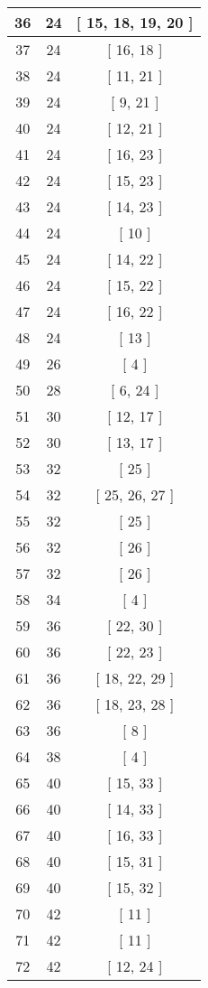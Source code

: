 \begin{center}
\begin{longtable}[H]{|| c c c ||}
\hline
36 & 24 & [ 15, 18, 19, 20 ] \\ 
\hline
37 & 24 & [ 16, 18 ] \\ 
\hline
38 & 24 & [ 11, 21 ] \\ 
\hline
39 & 24 & [ 9, 21 ] \\ 
\hline
40 & 24 & [ 12, 21 ] \\ 
\hline
41 & 24 & [ 16, 23 ] \\ 
\hline
42 & 24 & [ 15, 23 ] \\ 
\hline
43 & 24 & [ 14, 23 ] \\ 
\hline
44 & 24 & [ 10 ] \\ 
\hline
45 & 24 & [ 14, 22 ] \\ 
\hline
46 & 24 & [ 15, 22 ] \\ 
\hline
47 & 24 & [ 16, 22 ] \\ 
\hline
48 & 24 & [ 13 ] \\ 
\hline
49 & 26 & [ 4 ] \\ 
\hline
50 & 28 & [ 6, 24 ] \\ 
\hline
51 & 30 & [ 12, 17 ] \\ 
\hline
52 & 30 & [ 13, 17 ] \\ 
\hline
53 & 32 & [ 25 ] \\ 
\hline
54 & 32 & [ 25, 26, 27 ] \\ 
\hline
55 & 32 & [ 25 ] \\ 
\hline
56 & 32 & [ 26 ] \\ 
\hline
57 & 32 & [ 26 ] \\ 
\hline
58 & 34 & [ 4 ] \\ 
\hline
59 & 36 & [ 22, 30 ] \\ 
\hline
60 & 36 & [ 22, 23 ] \\ 
\hline
61 & 36 & [ 18, 22, 29 ] \\ 
\hline
62 & 36 & [ 18, 23, 28 ] \\ 
\hline
63 & 36 & [ 8 ] \\ 
\hline
64 & 38 & [ 4 ] \\ 
\hline
65 & 40 & [ 15, 33 ] \\ 
\hline
66 & 40 & [ 14, 33 ] \\ 
\hline
67 & 40 & [ 16, 33 ] \\ 
\hline
68 & 40 & [ 15, 31 ] \\ 
\hline
69 & 40 & [ 15, 32 ] \\ 
\hline
70 & 42 & [ 11 ] \\ 
\hline
71 & 42 & [ 11 ] \\ 
\hline
72 & 42 & [ 12, 24 ] \\ 

\end{longtable}
\end{center}
